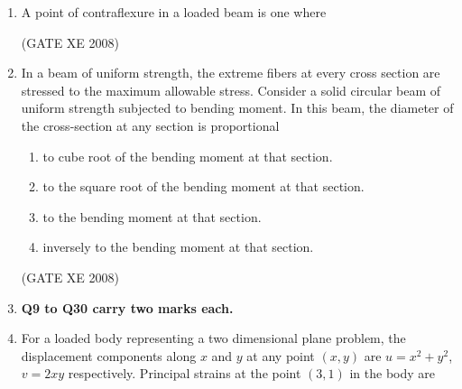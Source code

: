 \documentclass[12pt]{article}
\begin{document}
\begin{enumerate}
\item A point of contraflexure in a loaded beam is one where 

\begin{enumerate}
\end{enumerate}

(GATE XE 2008)

\item In a beam of uniform strength, the extreme fibers at every cross section are stressed to the maximum allowable stress. Consider a solid circular beam of uniform strength subjected to bending moment. In this beam, the diameter of the cross-section at any section is proportional  

\begin{enumerate}
\item  to cube root of the bending moment at that section. 
\item  to the square root of the bending moment at that section.  
\item  to the bending moment at that section.  
\item  inversely to the bending moment at that section. 
\end{enumerate}

(GATE XE 2008)

\item[] \textbf{Q9 to Q30 carry two marks each.}


\item For a loaded body representing a two dimensional plane problem, the displacement components along $x$ and $y$ at any point $(x, y)$ are $u = x^2 + y^2$, $v = 2xy$ respectively. Principal strains at the point $(3, 1)$ in the body are 

\begin{enumerate}
\end{enumerate}


\end{enumerate}
\end{document}
